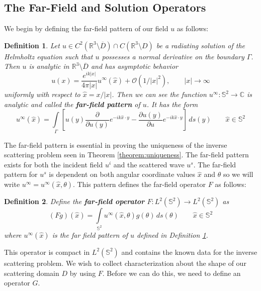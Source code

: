 \documentclass[]{article}
\newtheorem{definition}{Definition}
\newcommand{\bd}{\textbf}
\newcommand{\R}{\mathbb R}
\newcommand{\C}{\mathbb C}
\renewcommand{\S}{\mathbb S}
\begin{document}
			\subsection{The Far-Field and Solution Operators}
				We begin by defining the far-field pattern of our field $u$ as follows:
				\begin{definition}\label{def:far-field pattern}
					Let $u \in C^2(\R^3\setminus \overline D)\cap C(\R^3 \setminus D)$ be a radiating solution of the Helmholtz equation such that $u$ possesses a normal derivative on the boundary $\Gamma$. Then $u$ is analytic in $\R^3\setminus\overline D$ and has asymptotic behavior
					\begin{equation} \label{eq:far-field pattern}
						u(x) = \frac{e^{ik|x|}}{4\pi |x|} u^\infty(\hat x) + \mathcal O\left(1/|x|^2\right), \qquad |x|\to \infty
					\end{equation}
					uniformly with respect to $\hat x = x/|x|$. Then we can see the function $u^\infty:\S^2 \to \C$ is analytic and called the \bd{far-field pattern} of $u$. It has the form
					\begin{equation}
						u^\infty(\hat x) = \int\limits_\Gamma\left[u(y)\frac{\partial }{\partial u(y)}e^{-ik\hat x\cdot y} - \frac{\partial u(y)}{\partial u}e^{-ik\hat x\cdot y}\right]\, ds(y) \qquad \hat x\in \S^2 
					\end{equation}
				\end{definition}
				The far-field pattern is essential in proving the uniqueness of the inverse scattering problem seen in Theorem \ref{theorem:uniqueness}. The far-field pattern exists for both the incident field $u^i$ and the scattered wave $u^s$. The far-field pattern for $u^s$ is dependent on both angular coordinate values $\hat x$ and $\theta$ so we will write $u^\infty = u^\infty(\hat x, \theta)$. This pattern defines the far-field operator $F$ as follows:
				\begin{definition}\label{def:F}
					Define the \bd{far-field operator} $F:L^2(\mathbb S^2) \to L^2(\mathbb S^2)$ as
					\begin{equation}	
						(Fg)(\hat x) = \int\limits_{\mathbb S^2}u^\infty(\hat x, \theta)g(\theta)\, ds(\theta) \qquad \hat x\in \S^2
					\end{equation}
					where $u^\infty(\hat x)$ is the far field pattern of $u$ defined in Definition \ref{def:far-field pattern}.

				\end{definition}
				This operator is compact in $L^2(\S^2)$ and contains the known data for the inverse scattering problem. We wish to collect characterization about the shape of our scattering domain $D$ by using $F$. Before we can do this, we need to define an operator $G$.
\end{document}
